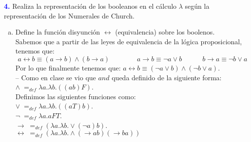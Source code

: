 \textbf{\textcolor{blue}{4.}}\Large
Realiza la representación de los booleanos en el cálculo
$\lambda$ según la representación de los Numerales de Church.
\begin{enumerate}[a)]
    \item Define la función disyunción $\leftrightarrow$ (equivalencia) sobre los boolenos.\\
    Sabemos que a partir de las leyes de equivalencia de la lógica proposicional, tenemos que:
    \begin{equation*}
        a \leftrightarrow b \equiv (a \rightarrow b) \land (b \rightarrow a)\quad \quad \quad \quad
            a \rightarrow b \equiv \neg a \lor b \quad \quad \quad
            b \rightarrow a \equiv \neg b \lor a
        \end{equation*}
        Por lo que finalmente tenemos que:
        $a \leftrightarrow b \equiv (\neg a \lor b) \land (\neg b \lor a )$.\\

        -- Como en clase se vio que $and$ queda definido de la siguiente forma:\\
        $\land \; =_{def} \lambda a. \lambda b.((ab)F)$.\\
        Definimos las siguientes funciones como:\\
        $\lor \; =_{def} \lambda a.\lambda b. ((aT)b)$.\\
        $\neg \; =_{def} \lambda a.aFT$.\\
        $\rightarrow \; =_{def}(\lambda a.\lambda b.\lor (\neg a)b)$.\\
        $\leftrightarrow \;
        =_{def} (\lambda a. \lambda b. \land(\rightarrow ab)(\rightarrow ba))$
        \newline
        

\end{enumerate}
